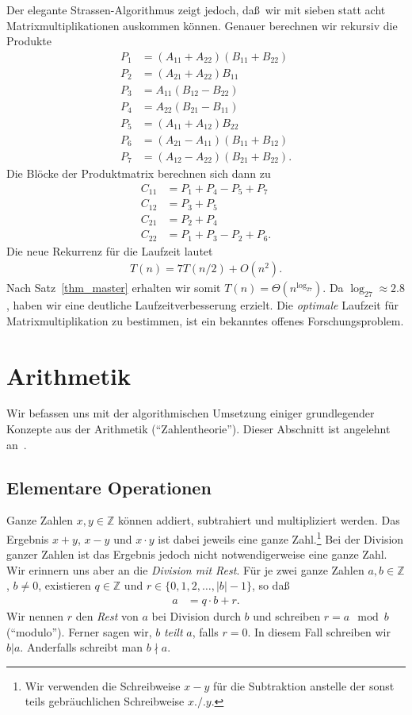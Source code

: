 \documentclass[10pt,reqno]{amsart}
\numberwithin{equation}{section}
\newcommand\ZZ{\mathbb Z}
\newcommand\Thm{Satz}
\begin{document}
Der elegante Strassen-Algorithmus zeigt jedoch, da\ss\ wir mit sieben statt acht Matrixmultiplikationen auskommen k\"onnen.
Genauer berechnen wir rekursiv die Produkte
\begin{align*}
	P_1&=(A_{11}+A_{22})(B_{11}+B_{22})\\
	P_2&=(A_{21}+A_{22})B_{11}\\
	P_3&=A_{11}(B_{12}-B_{22})\\
	P_4&=A_{22}(B_{21}-B_{11})\\
	P_5&=(A_{11}+A_{12})B_{22}\\
	P_6&=(A_{21}-A_{11})(B_{11}+B_{12})\\
	P_7&=(A_{12}-A_{22})(B_{21}+B_{22}).
\end{align*}
Die Bl\"ocke der Produktmatrix berechnen sich dann zu
\begin{align*}
	C_{11}&=P_1+P_4-P_5+P_7\\
	C_{12}&=P_3+P_5\\
	C_{21}&=P_2+P_4\\
	C_{22}&=P_1+P_3-P_2+P_6.
\end{align*}
Die neue Rekurrenz f\"ur die Laufzeit lautet
\begin{align*}
	T(n)=7T(n/2)+O(n^2).
\end{align*}
Nach \Thm~\ref{thm_master} erhalten wir somit $T(n)=\Theta(n^{\log_27})$.
Da $\log_27\approx2.8$, haben wir eine deutliche Laufzeitverbesserung erzielt.
Die {\em optimale} Laufzeit f\"ur Matrixmultiplikation zu bestimmen, ist ein bekanntes offenes Forschungsproblem.

\section{Arithmetik}\label{sec_arith}

Wir befassen uns mit der algorithmischen Umsetzung einiger grundlegender Konzepte aus der Arithmetik (``Zahlentheorie'').
Dieser Abschnitt ist angelehnt an~\cite{Cormen,Knuth}.

\subsection{Elementare Operationen}\label{sec_elem}
Ganze Zahlen $x,y\in\ZZ$ k\"onnen addiert, subtrahiert und multipliziert werden.
Das Ergebnis $x+y$, $x-y$ und $x\cdot y$ ist dabei jeweils eine ganze Zahl.\footnote{Wir verwenden die Schreibweise $x-y$ f\"ur die Subtraktion anstelle der sonst teils gebr\"auchlichen Schreibweise $x./.y$\enspace.}
Bei der Division ganzer Zahlen ist das Ergebnis jedoch nicht notwendigerweise eine ganze Zahl.
Wir erinnern uns aber an die {\em Division mit Rest}.
F\"ur je zwei ganze Zahlen $a,b\in\ZZ$, $b\neq0$, existieren $q\in\ZZ$ und $r\in\{0,1,2,\ldots,|b|-1\}$, so da\ss
	\begin{align*}
		a&=q\cdot b+r.
	\end{align*}
Wir nennen $r$ den {\em Rest} von $a$ bei Division durch $b$ und schreiben $r=a\mod b$ (``modulo'').
Ferner sagen wir, $b$ {\em teilt} $a$, falls $r=0$.
In diesem Fall schreiben wir $b|a$.
Anderfalls schreibt man $b\nmid a$.
\end{document}
